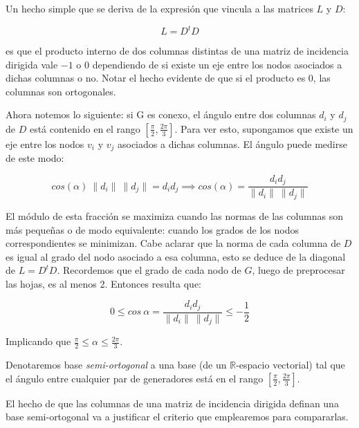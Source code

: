 \documentclass[conference,compsoc,a4paper]{IEEEtran}
\begin{document}
\bigskip


Un hecho simple que se deriva de la expresión que vincula a las matrices 
$L$ y $D$:

$$L = D^t D$$

es que el producto interno de dos columnas distintas de una matriz de 
incidencia dirigida vale $-1$ o $0$ dependiendo de si existe un eje 
entre los nodos asociados a dichas columnas o no. Notar el hecho 
evidente de que si el producto es $0$, las columnas son
 ortogonales.

\smallskip

Ahora notemos lo siguiente: si G es conexo, el ángulo entre dos 
columnas $d_i$ y $d_j$ de $D$ está contenido en el rango 
$[\frac{\pi}{2},\frac{2\pi}{3}]$. Para ver esto, supongamos que existe 
un eje entre los nodos $v_i$ y $v_j$ asociados a dichas columnas. 
El ángulo puede medirse de este modo:

$$cos(\alpha) \ \|d_i\| \ \|d_j\|= d_i  d_j \implies cos(\alpha) = 
\frac{d_i d_j}{\|d_i\| \ \|d_j\|}$$

El módulo de esta fracción se maximiza cuando las normas de las 
columnas son más pequeñas o de modo equivalente: cuando los grados de 
los nodos correspondientes se minimizan. Cabe aclarar que la norma de 
cada columna de $D$ es igual al grado del nodo asociado a esa columna, 
esto se deduce de la diagonal de $L = D^t D$. Recordemos que 
el grado de cada nodo de  $G$, luego de preprocesar las hojas, es al 
menos 2. Entonces resulta que:

$$0\le cos \ \alpha = \frac{d_i d_j}{\|d_i\| \ \|d_j\|} \le -\frac{1}{2}$$

\smallskip

Implicando que $\frac{\pi}{2}\le\alpha \leq \frac{2\pi}{3}$.

\smallskip

Denotaremos base \textit{semi-ortogonal} a una base (de un 
$\mathbb{R}$-espacio vectorial) tal que el ángulo entre cualquier par de 
generadores está en el rango $[\frac{\pi}{2},\frac{2\pi}{3}]$.

\smallskip

El hecho de que las columnas de una matriz de incidencia dirigida 
definan una base semi-ortogonal va a justificar el criterio que 
emplearemos para compararlas.

\bigskip

\end{document}
